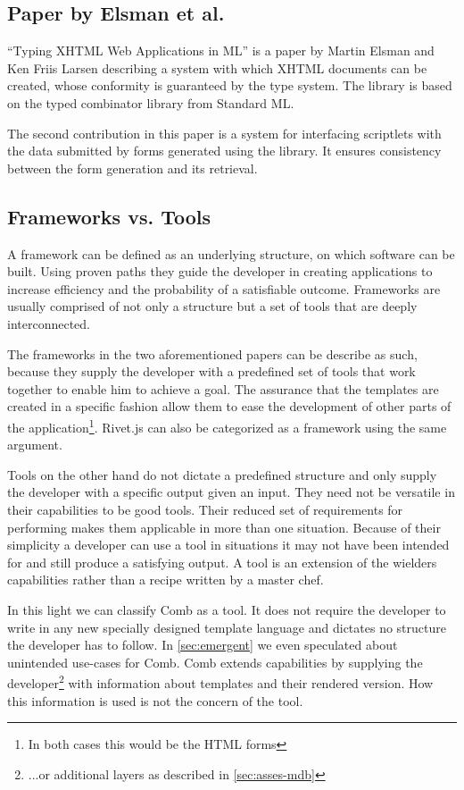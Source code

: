 \documentclass[thesis.tex]{subfiles}
\begin{document}
\subsection{Paper by Elsman et al.}
``Typing XHTML Web Applications in ML''\cite{ML} is a paper by Martin Elsman and
Ken Friis Larsen describing a system with which XHTML documents can be created,
whose conformity is guaranteed by the type system. The library is based on the
typed combinator library from Standard ML.

The second contribution in this paper is a system for interfacing scriptlets
with the data submitted by forms generated using the library.
It ensures consistency between the form generation and its retrieval.

\subsection{Frameworks vs. Tools}
A framework can be defined as an underlying structure, on which software can be
built. Using proven paths they guide the developer in creating applications to
increase efficiency and the probability of a satisfiable outcome.
Frameworks are usually comprised of not only a structure but a set of tools that
are deeply interconnected.

The frameworks in the two aforementioned papers can be describe as such, because
they supply the developer with a predefined set of tools that work together to
enable him to achieve a goal. The assurance that the templates are created in a
specific fashion allow them to ease the development of other parts of the
application\footnote{In both cases this would be the HTML forms}. Rivet.js can
also be categorized as a framework using the same argument.

Tools on the other hand do not dictate a predefined structure and only supply
the developer with a specific output given an input. They need not be versatile
in their capabilities to be good tools. Their reduced set of requirements for
performing makes them applicable in more than one situation. Because of their
simplicity a developer can use a tool in situations it may not have been
intended for and still produce a satisfying output. A tool is an extension of
the wielders capabilities rather than a recipe written by a master chef.

In this light we can classify Comb as a tool. It does not require the developer
to write in any new specially designed template language and dictates no
structure the developer has to follow. In \ref{sec:emergent} we even speculated
about unintended use-cases for Comb. Comb extends capabilities by supplying the
developer\footnote{...or additional layers as described in \ref{sec:asses-mdb}}
with information about templates and their rendered version.
How this information is used is not the concern of the tool.
\end{document}
